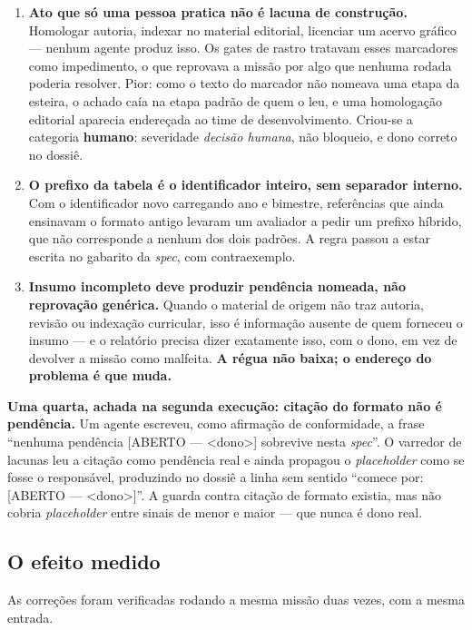 \documentclass[11pt,a4paper]{article}
\newcommand{\cod}[1]{{\ttfamily\small #1}}
\begin{document}
\begin{enumerate}
  \item \textbf{Ato que só uma pessoa pratica não é lacuna de construção.} Homologar autoria, indexar no material editorial, licenciar um acervo gráfico --- nenhum agente produz isso. Os gates de rastro tratavam esses marcadores como impedimento, o que reprovava a missão por algo que nenhuma rodada poderia resolver. Pior: como o texto do marcador não nomeava uma etapa da esteira, o achado caía na etapa padrão de quem o leu, e uma homologação editorial aparecia endereçada ao time de desenvolvimento. Criou-se a categoria \textbf{humano}: severidade \emph{decisão humana}, não bloqueio, e dono correto no dossiê.
  \item \textbf{O prefixo da tabela é o identificador inteiro, sem separador interno.} Com o identificador novo carregando ano e bimestre, referências que ainda ensinavam o formato antigo levaram um avaliador a pedir um prefixo híbrido, que não corresponde a nenhum dos dois padrões. A regra passou a estar escrita no gabarito da \emph{spec}, com contraexemplo.
  \item \textbf{Insumo incompleto deve produzir pendência nomeada, não reprovação genérica.} Quando o material de origem não traz autoria, revisão ou indexação curricular, isso é informação ausente de quem forneceu o insumo --- e o relatório precisa dizer exatamente isso, com o dono, em vez de devolver a missão como malfeita. \textbf{A régua não baixa; o endereço do problema é que muda.}
\end{enumerate}

\textbf{Uma quarta, achada na segunda execução: citação do formato não é pendência.} Um agente escreveu, como afirmação de conformidade, a frase ``nenhuma pendência \cod{[ABERTO — <dono>]} sobrevive nesta \emph{spec}''. O varredor de lacunas leu a citação como pendência real e ainda propagou o \emph{placeholder} como se fosse o responsável, produzindo no dossiê a linha sem sentido ``comece por: \cod{[ABERTO — <dono>]}''. A guarda contra citação de formato existia, mas não cobria \emph{placeholder} entre sinais de menor e maior --- que nunca é dono real.

\subsection{O efeito medido}

As correções foram verificadas rodando a mesma missão duas vezes, com a mesma entrada.
\end{document}
